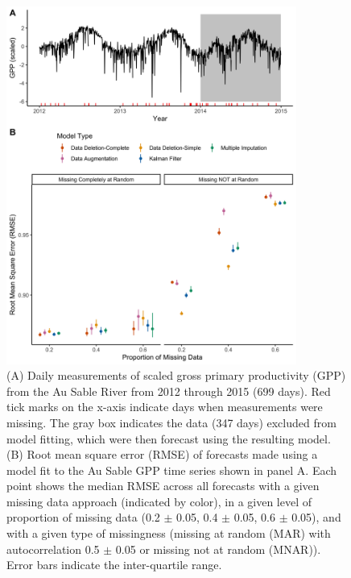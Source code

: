\documentclass{article}
\begin{document}
\begin{figure}
    \centering
    \noindent\includegraphics[width = 0.85\textwidth]{Figures/MockedUpFigures/RMSE_FullFigure_NoLineWithErrorBar_gaussian_auSable.png}
    \caption{(A) Daily measurements of scaled gross primary productivity (GPP) from the Au Sable River from 2012 through 2015 (699 days). Red tick marks on the x-axis indicate days when measurements were missing. The gray box indicates the data (347 days) excluded from model fitting, which were then forecast using the resulting model. (B) Root mean square error (RMSE) of forecasts made using a model fit to the Au Sable GPP time series shown in panel A. Each point shows the median RMSE across all forecasts with a given missing data approach (indicated by color), in a given level of proportion of missing data (0.2 $\pm$ 0.05, 0.4 $\pm$ 0.05, 0.6 $\pm$ 0.05), and with a given type of missingness (missing at random (MAR) with autocorrelation 0.5 $\pm$ 0.05 or missing not at random (MNAR)). Error bars indicate the inter-quartile range.}
    \label{fig:RMSE_Gaus}
\end{figure}
\end{document}

